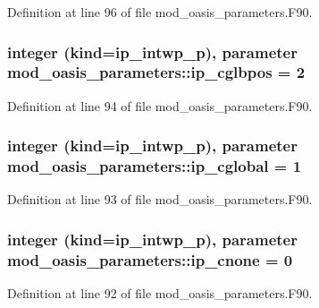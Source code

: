 Definition at line 96 of file mod\+\_\+oasis\+\_\+parameters.\+F90.

\hypertarget{classmod__oasis__parameters_aec700ad0c6a11dd35e5d6c2afb745fd0}{
\subsubsection[{ip\+\_\+cglbpos}]{\setlength{\rightskip}{0pt plus 5cm}integer (kind=ip\+\_\+intwp\+\_\+p), parameter mod\+\_\+oasis\+\_\+parameters\+::ip\+\_\+cglbpos = 2}}\label{classmod__oasis__parameters_aec700ad0c6a11dd35e5d6c2afb745fd0}


Definition at line 94 of file mod\+\_\+oasis\+\_\+parameters.\+F90.

\hypertarget{classmod__oasis__parameters_ae251e3ac1c9c82ae5db2a768d2d59d5f}{
\subsubsection[{ip\+\_\+cglobal}]{\setlength{\rightskip}{0pt plus 5cm}integer (kind=ip\+\_\+intwp\+\_\+p), parameter mod\+\_\+oasis\+\_\+parameters\+::ip\+\_\+cglobal = 1}}\label{classmod__oasis__parameters_ae251e3ac1c9c82ae5db2a768d2d59d5f}


Definition at line 93 of file mod\+\_\+oasis\+\_\+parameters.\+F90.

\hypertarget{classmod__oasis__parameters_ae043e4e2c2b7f04fec7d8c061ef52934}{
\subsubsection[{ip\+\_\+cnone}]{\setlength{\rightskip}{0pt plus 5cm}integer (kind=ip\+\_\+intwp\+\_\+p), parameter mod\+\_\+oasis\+\_\+parameters\+::ip\+\_\+cnone = 0}}\label{classmod__oasis__parameters_ae043e4e2c2b7f04fec7d8c061ef52934}


Definition at line 92 of file mod\+\_\+oasis\+\_\+parameters.\+F90.

